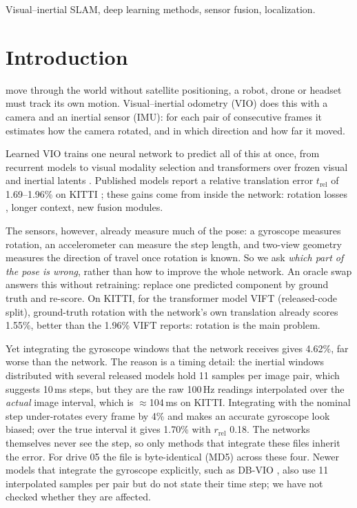 \documentclass[letterpaper,journal]{IEEEtran}
\begin{document}
\begin{IEEEkeywords}
Visual--inertial SLAM, deep learning methods, sensor fusion, localization.
\end{IEEEkeywords}

\section{Introduction}

 move through the world without satellite positioning, a robot, drone or headset must track its own motion. Visual--inertial odometry (VIO) does this with a camera and an inertial sensor (IMU): for each pair of consecutive frames it estimates how the camera rotated, and in which direction and how far it moved.

Learned VIO trains one neural network to predict all of this at once, from recurrent models \cite{Clark2017,Han2019} to visual modality selection \cite{Yang2022} and transformers over frozen visual and inertial latents \cite{Kurt2024}. Published models report a relative translation error $t_\mathrm{rel}$ of 1.69--1.96\% on KITTI \cite{Kurt2024,Ma2026,Wan2026}; these gains come from inside the network: rotation losses \cite{Chen2022}, longer context, new fusion modules.

The sensors, however, already measure much of the pose: a gyroscope measures rotation, an accelerometer can measure the step length, and two-view geometry measures the direction of travel once rotation is known. So we ask \emph{which part of the pose is wrong}, rather than how to improve the whole network. An oracle swap answers this without retraining: replace one predicted component by ground truth and re-score. On KITTI, for the transformer model VIFT \cite{Kurt2024} (released-code split), ground-truth rotation with the network's own translation already scores 1.55\%, better than the 1.96\% VIFT reports: rotation is the main problem.

Yet integrating the gyroscope windows that the network receives gives 4.62\%, far worse than the network. The reason is a timing detail: the inertial windows distributed with several released models \cite{Yang2022,Kurt2024,Chen2023NASVIO,Park2024ULVIO} hold 11 samples per image pair, which suggests 10\,ms steps, but they are the raw 100\,Hz readings interpolated over the \emph{actual} image interval, which is $\approx$104\,ms on KITTI. Integrating with the nominal step under-rotates every frame by 4\% and makes an accurate gyroscope look biased; over the true interval it gives 1.70\% with $r_\mathrm{rel}$ 0.18. The networks themselves never see the step, so only methods that integrate these files inherit the error. For drive 05 the file is byte-identical (MD5) across these four. Newer models that integrate the gyroscope explicitly, such as DB-VIO \cite{Wan2026}, also use 11 interpolated samples per pair but do not state their time step; we have not checked whether they are affected.
\end{document}
